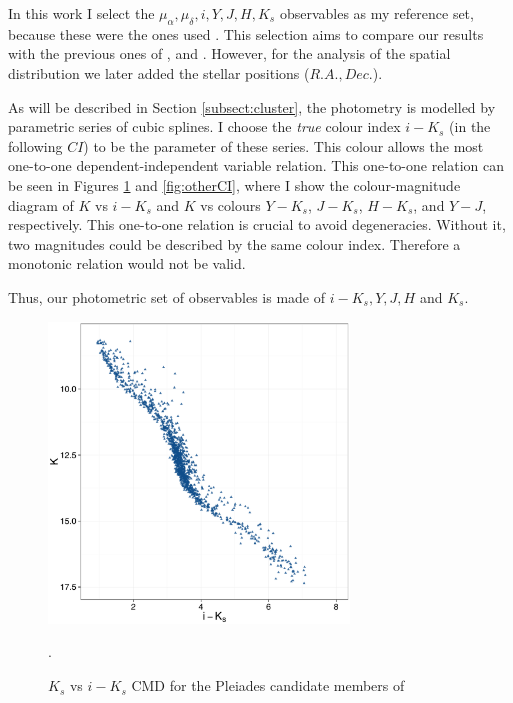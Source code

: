 In this work I select the $\mu_{\alpha},\mu_{\delta},i,Y,J,H,K_s$ observables as my reference set, because these were the ones used \citet{Bouy2015}. This selection aims to compare our results with the previous ones of \citet{Sarro2014}, and \citet{Bouy2015}. However, for the analysis of the spatial distribution we later added the stellar positions ($R.A., Dec.$).

As will be described in Section \ref{subsect:cluster}, the photometry is modelled by parametric series of cubic splines. I choose the \emph{true} colour index $i-K_s$ (in the following $CI$) to be the parameter of these series. This colour allows the most one-to-one dependent-independent variable relation. This one-to-one relation can be seen in Figures \ref{fig:CI} and \ref{fig:otherCI}, where I show the colour-magnitude diagram of $K$ vs $i-K_s$ and $K$ vs colours $Y-K_s$, $J-K_s$, $H-K_s$, and $Y-J$, respectively.  This one-to-one relation is crucial to avoid degeneracies. Without it, two magnitudes could be described by the same colour index. Therefore a monotonic relation would not be valid. 

Thus, our photometric set of observables is made of $i-K_s, Y,J,H$ and $K_s$. 

\begin{figure}[ht!]
\begin{center}
\includegraphics[page=1,height=8cm]{background/Figures/CIs.pdf}
\caption{$K_s$ vs $i-K_s$ CMD for the Pleiades candidate members of \citet{Bouy2015}}.
\label{fig:CI}
\end{center}
\end{figure}

